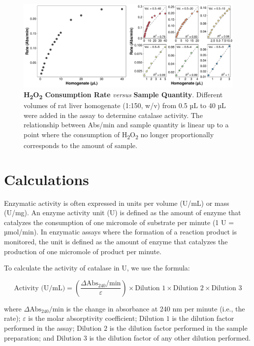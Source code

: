\documentclass[
  9pt,
  american,
  a5paper,
  extrafontsizes,onecolumn,openright
  ]{memoir}
\newlength{\rf}
\begin{document}
\begin{figure}

\includegraphics[width=1\linewidth]{Volume-1_files/figure-latex/fig-cat-linear-range-1} \hfill{}

\caption{\textbf{H\textsubscript{2}O\textsubscript{2} Consumption Rate} \emph{versus} \textbf{Sample Quantity}. Different volumes of rat liver homogenate (1:150, w/v) from 0.5 µL to 40 µL were added in the assay to determine catalase activity. The relationship between Abs/min and sample quantity is linear up to a point where the consumption of H\textsubscript{2}O\textsubscript{2} no longer proportionally corresponds to the amount of sample.}\label{fig:fig-cat-linear-range}
\end{figure}

\normalsize

\section{Calculations}\label{calculations}

Enzymatic activity is often expressed in units per volume (U/mL) or mass (U/mg). An enzyme activity unit (U) is defined as the amount of enzyme that catalyzes the consumption of one micromole of substrate per minute (1 U = µmol/min). In enzymatic assays where the formation of a reaction product is monitored, the unit is defined as the amount of enzyme that catalyzes the production of one micromole of product per minute.

To calculate the activity of catalase in U, we use the formula:

\[ 
\text{Activity (U/mL)} = \left( \frac{\Delta \text{Abs}_{240}/\text{min}}{\varepsilon} \right) \times \text{Dilution 1} \times \text{Dilution 2} \times \text{Dilution 3}
\]

where \(\Delta \text{Abs}_{240}/\text{min}\) is the change in absorbance at 240 nm per minute (i.e., the rate); \(\varepsilon\) is the molar absorptivity coefficient; \(\text{Dilution 1}\) is the dilution factor performed in the assay; \(\text{Dilution 2}\) is the dilution factor performed in the sample preparation; and \(\text{Dilution 3}\) is the dilution factor of any other dilution performed.
\end{document}
